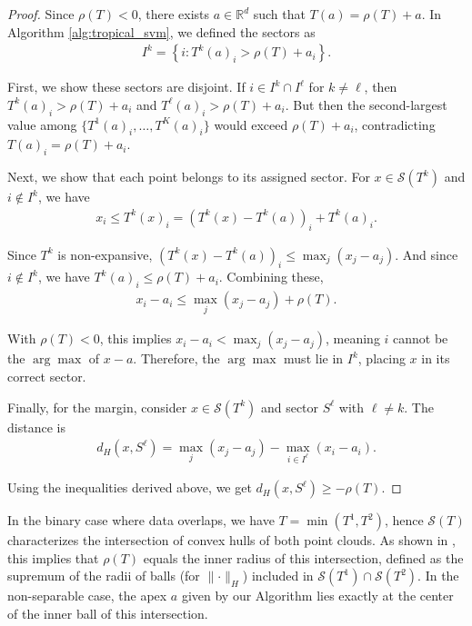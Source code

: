 \documentclass{article}
\renewcommand{\geq}{\geqslant}
\renewcommand{\leq}{\leqslant}
\newcommand{\R}{\mathbb{R}}
\begin{document}
\begin{proof}
Since $\rho(T) < 0$, there exists $a \in \R^d$ such that $T(a) = \rho(T) + a$. In Algorithm \ref{alg:tropical_svm}, we defined the sectors as
\begin{align}
I^k = \left\{i : T^k(a)_i > \rho(T) + a_i\right\}.
\end{align}

First, we show these sectors are disjoint. If $i \in I^k \cap I^{\ell}$ for $k \neq \ell$, then $T^k(a)_i > \rho(T) + a_i$ and $T^{\ell}(a)_i > \rho(T) + a_i$. But then the second-largest value among $\{T^1(a)_i,\ldots,T^K(a)_i\}$ would exceed $\rho(T) + a_i$, contradicting $T(a)_i = \rho(T) + a_i$.

Next, we show that each point belongs to its assigned sector. For $x \in \mathcal{S}(T^k)$ and $i \not\in I^k$, we have
\begin{align}
x_i \leq T^k(x)_i = (T^k(x) - T^k(a))_i + T^k(a)_i.
\end{align}

Since $T^k$ is non-expansive, $(T^k(x) - T^k(a))_i \leq \max_j(x_j - a_j)$. And since $i \not\in I^k$, we have $T^k(a)_i \leq \rho(T) + a_i$. Combining these,
\begin{align}
x_i - a_i \leq \max_j(x_j - a_j) + \rho(T).
\end{align}

With $\rho(T) < 0$, this implies $x_i - a_i < \max_j(x_j - a_j)$, meaning $i$ cannot be the $\arg\max$ of $x - a$. Therefore, the $\arg\max$ must lie in $I^k$, placing $x$ in its correct sector.

Finally, for the margin, consider $x \in \mathcal{S}(T^k)$ and sector $S^{\ell}$ with $\ell \neq k$. The distance is
\begin{align}
d_H(x, S^{\ell}) = \max_j(x_j - a_j) - \max_{i \in I^{\ell}}(x_i - a_i).
\end{align}

Using the inequalities derived above, we get $d_H(x, S^{\ell}) \geq -\rho(T)$.
\end{proof}

In the binary case where data overlaps, we have $T = \min(T^1, T^2)$, hence $\mathcal{S}(T)$ characterizes the intersection of convex hulls of both point clouds. As shown in \cite{akian2020}, this implies that $\rho(T)$ equals the inner radius of this intersection, defined as the supremum of the radii of balls (for $\lVert\cdot\rVert_H$) included in $\mathcal{S}(T^1) \cap \mathcal{S}(T^2)$. In the non-separable case, the apex $a$ given by our Algorithm lies exactly at the center of the inner ball of this intersection.
\end{document}
